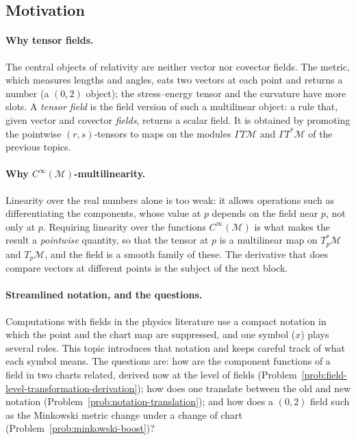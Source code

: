 \documentclass[11pt]{article}
\newcommand{\TpM}{T_p\mathcal M}
\newcommand{\Cinf}{C^\infty(\mathcal M)}
\begin{document}
\subsection*{Motivation}

\paragraph{Why tensor fields.}
The central objects of relativity are neither vector nor covector fields. The metric, which measures lengths and angles, eats two vectors at each point and returns a number (a $(0,2)$ object); the stress--energy tensor and the curvature have more slots. A \emph{tensor field} is the field version of such a multilinear object: a rule that, given vector and covector \emph{fields}, returns a scalar field. It is obtained by promoting the pointwise $(r,s)$-tensors to maps on the modules $\Gamma T\mathcal M$ and $\Gamma T^*\mathcal M$ of the previous topics.

\paragraph{Why $\Cinf$-multilinearity.}
Linearity over the real numbers alone is too weak: it allows operations such as differentiating the components, whose value at $p$ depends on the field near $p$, not only at $p$. Requiring linearity over the functions $\Cinf$ is what makes the result a \emph{pointwise} quantity, so that the tensor at $p$ is a multilinear map on $T_p^*\mathcal M$ and $\TpM$, and the field is a smooth family of these. The derivative that does compare vectors at different points is the subject of the next block.

\paragraph{Streamlined notation, and the questions.}
Computations with fields in the physics literature use a compact notation in which the point and the chart map are suppressed, and one symbol ($x$) plays several roles. This topic introduces that notation and keeps careful track of what each symbol means. The questions are: how are the component functions of a field in two charts related, derived now at the level of fields (Problem~\ref{prob:field-level-transformation-derivation}); how does one translate between the old and new notation (Problem~\ref{prob:notation-translation}); and how does a $(0,2)$ field such as the Minkowski metric change under a change of chart (Problem~\ref{prob:minkowski-boost})?
\end{document}
